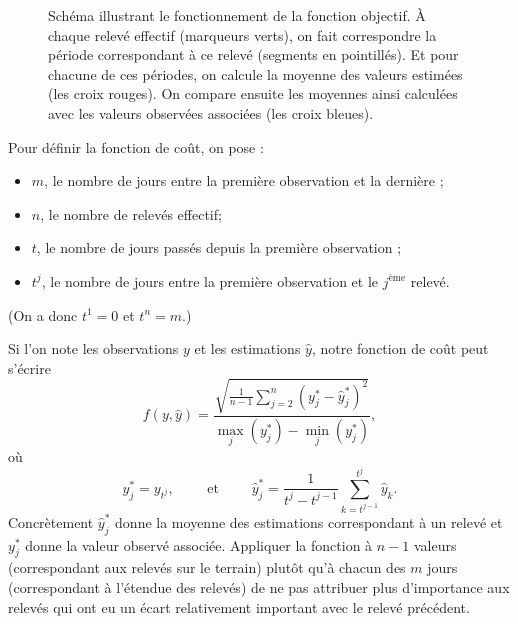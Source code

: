 \begin{figure}[ht]
\caption{Schéma illustrant le fonctionnement de la fonction objectif. À chaque relevé effectif (marqueurs verts), on fait correspondre la période correspondant à ce relevé (segments en pointillés).
Et pour chacune de ces périodes, on calcule la moyenne des valeurs estimées (les croix rouges). On compare ensuite les moyennes ainsi calculées avec les valeurs observées associées (les croix bleues).}
\label{fig:calib}
\end{figure}

Pour définir la fonction de coût, on pose :
\begin{itemize}
 \item $m$, le nombre de jours entre la première observation et la dernière ;
 \item $n$, le nombre de relevés effectif;
 \item $t$, le nombre de jours passés depuis la première observation ;
 \item $t^j$, le nombre de jours entre la première observation et le $j^{\text{ème}}$ relevé.
\end{itemize}
(On a donc $t^1 = 0$ et $t^n = m$.)

Si l'on note les observations $y$ et les estimations $\hat y$, notre fonction de coût peut s'écrire
$$
f(y, \hat y) = \frac{\sqrt{\frac{1}{n-1}\sum_{j=2}^n\left( y^*_j - \hat y^*_j \right)^2}}{\max_j(y^*_j) - \min_j(y^*_j)},
$$
où 
$$y^*_j =  y_{t^j}, \qquad \text{ et } \qquad \hat y^*_j = \frac{1}{t^j - t^{j-1}}\sum_{k=t^{j-1}}^{t^j} \hat y_k.$$
Concrètement $\hat y^*_j$ donne la moyenne des estimations correspondant à un relevé et $y^*_j$ donne la valeur observé associée.
Appliquer la fonction à $n-1$ valeurs (correspondant aux relevés sur le terrain) plutôt qu'à chacun des $m$ jours (correspondant à l'étendue des relevés) de ne pas attribuer plus d'importance aux relevés qui ont eu un écart relativement important avec le relevé précédent.




